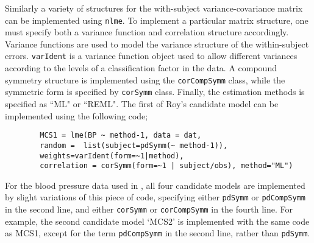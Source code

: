 \documentclass[MAIN.tex]{subfiles}
\begin{document}
	Similarly a variety of structures for the with-subject variance-covariance matrix can be implemented using \texttt{nlme}. To implement a particular matrix structure, one must specify both a variance function and correlation structure accordingly. Variance functions are used to model the variance structure of the within-subject errors. \texttt{varIdent} is a variance function object used to allow different variances according to the levels of a classification factor in the data. A compound symmetry structure is implemented using the \texttt{corCompSymm} class, while the symmetric form is specified by \texttt{corSymm} class. Finally, the estimation methods is specified as ``ML" or ``REML".
	\newpage
	The first of Roy's candidate model can be implemented using the following code;\\
	
	\begin{framed}
		\begin{verbatim}
		MCS1 = lme(BP ~ method-1, data = dat,
		random =  list(subject=pdSymm(~ method-1)),
		weights=varIdent(form=~1|method),
		correlation = corSymm(form=~1 | subject/obs), method="ML")
		\end{verbatim}
	\end{framed}
	
	For the blood pressure data used in \citet{roy}, all four candidate models are implemented by slight variations of this piece of code, specifying either \texttt{pdSymm} or \texttt{pdCompSymm} in the second line, and either \texttt{corSymm} or \texttt{corCompSymm} in the fourth line.
	For example, the second candidate model `MCS2' is implemented with the same code as MCS1, except for the term \texttt{pdCompSymm} in the second line, rather than \texttt{pdSymm}.
	\\
	
\end{document}
